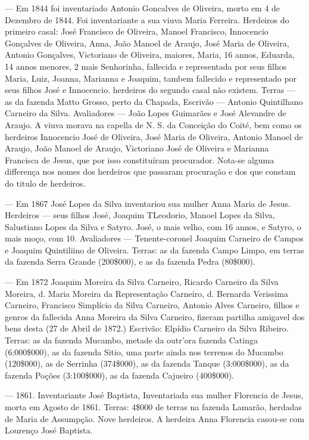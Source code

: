 
— Em 1844 foi inventariado Antonio Goncalves de Oliveira, morto em 4 de Dezembro de 1844. Foi inventariante a sua viuva Maria Ferreira. Herdeiros do primeiro casal: José Francisco de Oliveira, Manoel Francisco, Innocencio Gonçalves de Oliveira, Anna, João Manoel de Araujo, José Maria de Oliveira, Antonio Gonçalves, Victoriano de Oliveira, maiores, Maria, 16 annos, Eduarda, 14 annos menores, 2 mais Senhorinha, fallecida e representada por seus filhos Maria, Luiz, Joanna, Marianna e Joaquim, tambem fallecido e representado por seus filhos José e Innocencio. herdeiros do segundo casal não existem. Terras — as da fazenda Matto Grosso, perto da Chapada, Escrivão — Antonio Quintilhano Carneiro da Silva. Avaliadores — João Lopes Guimarães e José Alevandre de Araujo. A viuva morava na capella de N. S. da Conceição do Coité, bem como os herdeiros Innocencio José de Oliveira, José Maria de Oliveira, Antonio Manoel de Araujo, João Manoel de Araujo, Victoriano José de Oliveira e Marianna Francisca de Jesus, que por isso constituíram procurador. Nota-se alguma differença nos nomes dos herdeiros que passaram procuração e dos que constam do titulo de herdeiros.


— Em 1867 José Lopes da Silva inventariou sua mulher Anna Maria de Jesus. Herdeiros — seus filhos José, Joaquim TLeodorio, Manoel Lopes da Silva, Salustiano Lopes da Silva e Satyro. José, o mais velho, com 16 annos, e Satyro, o mais moço, com 10. Avaliadores — Tenente-coronel Joaquim Carneiro de Campos e Joaquim Quintiliino de Oliveira. Terras: as da fazenda Campo Limpo, em terras da fazenda Serra Grande (200\$000), e as da fazenda Pedra (80\$000).

— Em 1872 Joaquim Moreira da Silva Carneiro, Ricardo Carneiro da Silva Moreira, d. Maria Moreira da Representação Carneiro, d. Bernarda Verissima Carneiro, Francisco Simplício da Silva Carneiro, Antonio Alves Carneiro, filhos e genros da fallecida Anna Moreira da Silva Carneiro, fizeram partilha amigavel dos bens desta (27 de Abril de 1872.) Escrivão: Elpídio Carneiro da Silva Ribeiro. Terras: as da fazenda Mucambo, metade da outr'ora fazenda Catinga (6:000\$000), as da fazenda Sitio, uma parte ainda nos terrenos do Mucambo (120\$000), as de Serrinha (374\$000), as da fazenda Tanque (3:000\$000), as da fazenda Poções (3:100\$000), as da fazenda Cajueiro (400\$000).

— 1861. Inventariante José Baptista, Inventariada sua mulher Florencia de Jesus, morta em Agosto de 1861. Terras: 4\$000 de terras na fazenda Lamarão, herdadas de Maria de Assumpção. Nove herdeiros. A herdeira Anna Florencia casou-se com Lourenço José Baptista.

